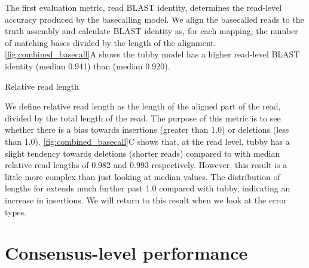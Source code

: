 The first evaluation metric, read BLAST identity, determines the read-level accuracy produced by the basecalling model. We align the basecalled reads to the truth assembly and calculate BLAST identity as, for each mapping, the number of matching bases divided by the length of the alignment. \autoref{fig:combined_basecall}A shows the tubby model has a higher read-level BLAST identity (median 0.941) than \guppy{} (median 0.920).

Relative read length

We define relative read length as the length of the aligned part of the read, divided by the total length of the read. The purpose of this metric is to see whether there is a bias towards insertions (greater than 1.0) or deletions (less than 1.0). \autoref{fig:combined_basecall}C shows that, at the read level, tubby has a slight tendency towards deletions (shorter reads) compared to \guppy{} with median relative read lengths of 0.982 and 0.993 respectively. However, this result is a little more complex than just looking at median values. The distribution of lengths for \guppy{} extends much further past 1.0 compared with tubby, indicating an increase in insertions. We will return to this result when we look at the error types.


\section{Consensus-level performance}

